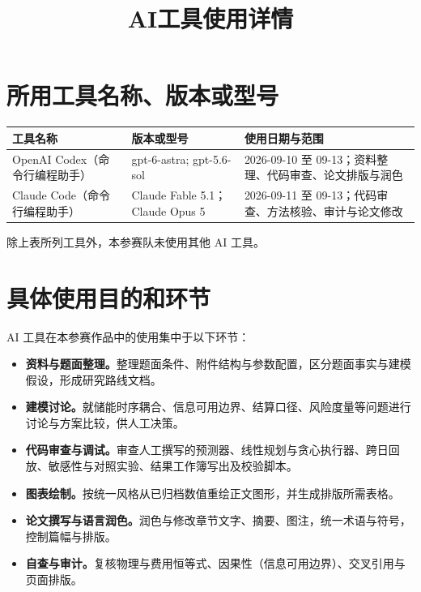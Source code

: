 \documentclass[UTF8,zihao=-4]{ctexart}
\title{AI工具使用详情}
\author{}
\date{}
\begin{document}
\maketitle


\section{所用工具名称、版本或型号}

\begin{longtable}{p{}p{}p{}}
\toprule
工具名称 & 版本或型号 & 使用日期与范围 \\
\midrule
\endhead
OpenAI Codex（命令行编程助手） & gpt-6-astra; gpt-5.6-sol & 2026-09-10 至 09-13；资料整理、代码审查、论文排版与润色 \\
Claude Code（命令行编程助手） & Claude Fable 5.1；Claude Opus 5 & 2026-09-11 至 09-13；代码审查、方法核验、审计与论文修改 \\
\bottomrule
\end{longtable}

\noindent 除上表所列工具外，本参赛队未使用其他 AI 工具。

\section{具体使用目的和环节}

AI 工具在本参赛作品中的使用集中于以下环节：

\begin{itemize}
\item \textbf{资料与题面整理。}整理题面条件、附件结构与参数配置，区分题面事实与建模假设，形成研究路线文档。
\item \textbf{建模讨论。}就储能时序耦合、信息可用边界、结算口径、风险度量等问题进行讨论与方案比较，供人工决策。
\item \textbf{代码审查与调试。}审查人工撰写的预测器、线性规划与贪心执行器、跨日回放、敏感性与对照实验、结果工作簿写出及校验脚本。
\item \textbf{图表绘制。}按统一风格从已归档数值重绘正文图形，并生成排版所需表格。
\item \textbf{论文撰写与语言润色。}润色与修改章节文字、摘要、图注，统一术语与符号，控制篇幅与排版。
\item \textbf{自查与审计。}复核物理与费用恒等式、因果性（信息可用边界）、交叉引用与页面排版。
\end{itemize}
\end{document}
